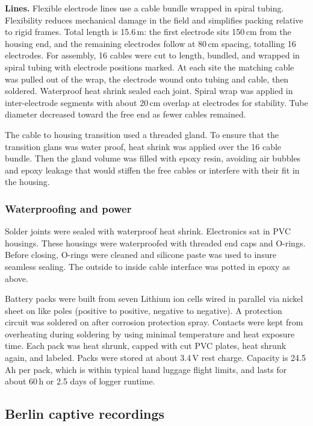 \textbf{Lines.} Flexible electrode lines use a cable bundle wrapped in spiral tubing.
Flexibility reduces mechanical damage in the field and simplifies packing relative to rigid frames.
Total length is 15.6\,m: the first electrode sits 150\,cm from the housing end, and the remaining electrodes follow at 80\,cm spacing, totalling 16 electrodes.
For assembly, 16 cables were cut to length, bundled, and wrapped in spiral tubing with electrode positions marked.
At each site the matching cable was pulled out of the wrap, the electrode wound onto tubing and cable, then soldered.
Waterproof heat shrink sealed each joint.
Spiral wrap was applied in inter-electrode segments with about 20\,cm overlap at electrodes for stability.
Tube diameter decreased toward the free end as fewer cables remained.

The cable to housing transition used a threaded gland.
To ensure that the transition glans was water proof, heat shrink was applied over the 16 cable bundle.
Then the gland volume was filled with epoxy resin, avoiding air bubbles and epoxy leakage that would stiffen the free cables or interfere with their fit in the housing.


\subsubsection{Waterproofing and power}

Solder joints were sealed with waterproof heat shrink. 
Electronics sat in PVC housings. 
These housings were waterproofed with threaded end caps and O-rings. 
Before closing, O-rings were cleaned and silicone paste was used to insure seamless sealing. 
The outside to inside cable interface was potted in epoxy as above.

Battery packs were built from seven Lithium ion cells wired in parallel via nickel sheet on like poles (positive to positive, negative to negative).
A protection circuit was soldered on after corrosion protection spray. 
Contacts were kept from overheating during soldering by using minimal temperature and heat exposure time. 
Each pack was heat shrunk, capped with cut PVC plates, heat shrunk again, and labeled. 
Packs were stored at about 3.4\,V rest charge. 
Capacity is 24.5\,Ah per pack, which is within typical hand luggage flight limits, and lasts for about 60\,h or 2.5 days of logger runtime.

\subsection{Berlin captive recordings}

